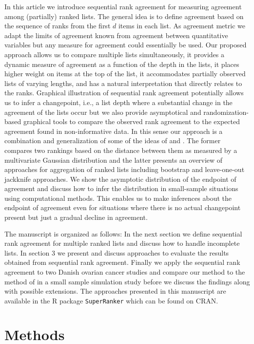 \documentclass[12pt,a4paper]{article}
\theoremstyle{plain}
\begin{document}
In this article we introduce sequential rank agreement for measuring
agreement among (partially) ranked lists.  The general idea is to
define agreement based on the sequence of ranks from the first $d$
items in each list. As agreement metric we adapt the limits of
agreement known from agreement between quantitative variables
\citep{alt:bland:1983,Carstensen2010} but any measure for agreement
could essentially be used. Our proposed approach allows us to
compare multiple lists simultaneously, it provides a dynamic
measure of agreement as a function of the depth in the lists, it places
higher weight on items at the top of the list, it accommodates partially
observed lists of varying lengths, and has a natural interpretation
that directly relates to the ranks.  Graphical illustration of
sequential rank agreement potentially allows us to infer a
changepoint, i.e., a list depth where a substantial change in the agreement of
the lists occur but we also provide asymptotical and randomization-based graphical
tools to compare the observed rank agreement to the expected agreement
found in non-informative data.  In this sense our approach is a
combination and generalization of some of the ideas of
\citet{Carterette2009} and \citet{Boulesteix2009}. The former compares
two rankings based on the distance between them as measured by a
multivariate Gaussian distribution and the latter presents an overview
of approaches for aggregation of ranked lists including bootstrap and
leave-one-out jackknife approaches. We show the asymptotic
distribution of the endpoint of agreement and discuss how to infer the
distribution in small-sample situations using computational
methods. This enables us to make inferences about the endpoint of
agreement even for situations where there is no actual changepoint
present but just a gradual decline in agreement.

The manuscript is organized as follows: In the next section we define
sequential rank agreement for multiple ranked lists and discuss how to
handle incomplete lists. In section 3 we present and discuss
approaches to evaluate the results obtained from sequential rank
agreement. Finally we apply the sequential rank agreement to two
Danish ovarian cancer studies and compare our method to the method of
\citet{hall:schi:2012} in a small sample simulation study before we
discuss the findings along with possible extensions. The approaches
presented in this manuscript are available in the R package
\texttt{SuperRanker} which can be found on CRAN.


\section{Methods}
\end{document}
